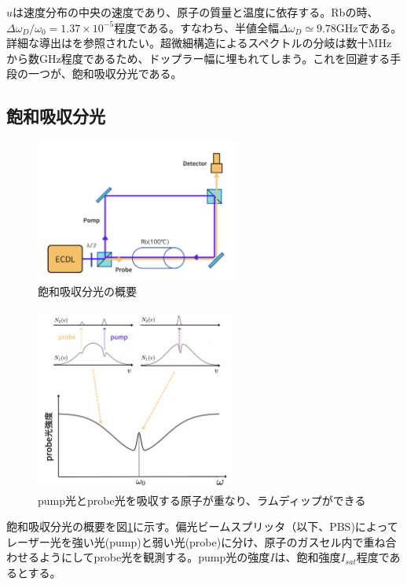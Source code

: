 \documentclass[dvipdfmx]{jsreport}
\begin{document}
$u$は速度分布の中央の速度であり、原子の質量と温度に依存する。Rbの時、$\Delta\omega_D/\omega_0 = 1.37\times10^{-5}$程度である。すなわち、半値全幅$\Delta\omega_D\simeq\text{9.78GHz}$である。詳細な導出は\cite{foot}を参照されたい。超微細構造によるスペクトルの分岐は数十MHzから数GHz程度であるため、ドップラー幅に埋もれてしまう。これを回避する手段の一つが、飽和吸収分光である。

\subsection{飽和吸収分光}
\begin{figure}
\centering
\includegraphics[width=0.6\textwidth]{images/sas.png}
\caption{\label{fig:sas}飽和吸収分光の概要}
\end{figure}
\begin{figure}
\centering
\includegraphics[width=0.6\textwidth]{images/sas_graph.png}
\caption{\label{fig:sas-graph}pump光とprobe光を吸収する原子が重なり、ラムディップができる}
\end{figure}
飽和吸収分光の概要を図\ref{fig:sas}に示す。偏光ビームスプリッタ（以下、PBS)によってレーザー光を強い光(pump)と弱い光(probe)に分け、原子のガスセル内で重ね合わせるようにしてprobe光を観測する。pump光の強度$I$は、飽和強度$I_{sat}$程度であるとする。
\end{document}
